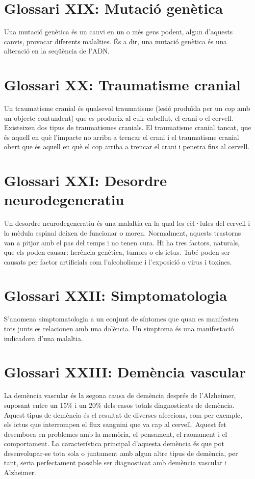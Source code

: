 \documentclass[a4paper,12pt]{report}
\begin{document}
\section*{Glossari XIX: Mutació genètica}
Una mutació genètica és un canvi en un o més gens podent, algun d'aquests canvis, provocar diferents malalties. És a dir, una mutació genètica és una alteració en la seqüència de l'ADN.
\section*{Glossari XX: Traumatisme cranial}
Un traumatisme cranial és qualsevol traumatisme (lesió produïda per un cop amb un objecte contundent)
 que es produeix al cuir cabellut, el crani o el cervell. Existeixen dos tipus de traumatismes cranials. El traumatisme cranial tancat, que és aquell en què l'impacte no arriba a trencar el crani i el traumatisme cranial obert que és aquell en què el cop arriba a trencar el crani i penetra fins al cervell.
\section*{Glossari XXI: Desordre neurodegeneratiu}
Un desordre neurodegeneratiu és una malaltia en la qual les cèl·lules del cervell i la mèdula espinal deixen de funcionar o moren. Normalment, aquests trastorns van a pitjor amb el pas del temps i no tenen cura. Hi ha tres factors, naturals, que els poden causar: herència genètica, tumors o els ictus. Tabé poden ser causats per factor artificials com l'alcoholisme i l'exposició a virus i toxines.
\section*{Glossari XXII: Simptomatologia}
S'anomena simptomatologia a un conjunt de síntomes que quan es manifesten tots junts es relacionen amb una dolència. Un simptoma és una manifestació indicadora d'una malaltia.
\section*{Glossari XXIII: Demència vascular}
La demència vascular és la segona causa de demència després de l'Alzheimer, suposant entre un 15\% i un 20\% dels casos totals diagnosticats de demència.\\
Aquest tipus de demència és el resultat de diverses afeccions, com per exemple, els ictus que interrompen el flux sanguini que va cap al cervell. Aquest fet desemboca en problemes amb la memòria, el pensament, el raonament i el comportament. La característica principal d'aquesta demència és que pot desenvolupar-se tota sola o juntament amb algun altre tipus de demència, per tant, seria perfectament possible ser diagnosticat amb demència vascular i Alzheimer.
\end{document}
